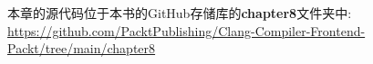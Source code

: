 本章的源代码位于本书的GitHub存储库的\textbf{chapter8}文件夹中: \url{https://github.com/PacktPublishing/Clang-Compiler-Frontend-Packt/tree/main/chapter8}
